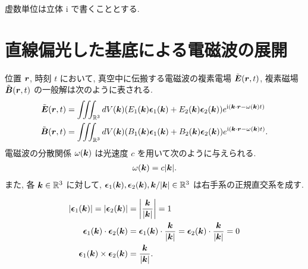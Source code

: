 \documentclass[a4paper,dvipdfmx]{jsarticle}
\theoremstyle{definition}
\begin{document}
\title{}
\author{
  学籍番号:21B00349\\
  氏名:宇佐見　大希\\
}
\maketitle

\newcommand{\ZZ}{\mathbb{Z}}
\newcommand{\RR}{\mathbb{R}}
\newcommand{\CC}{\mathbb{C}}
\newcommand{\EE}{\vb*{E}}
\newcommand{\Et}{\tilde{E}}
\newcommand{\ET}{\tilde{\vb*{E}}}
\newcommand{\Ec}{\mathcal{E}}
\newcommand{\EC}{\vb*{\mathcal{E}}}
\newcommand{\BB}{\vb*{B}}
\newcommand{\LL}{\vb*{L}}
\renewcommand{\AA}{\vb*{A}}
\newcommand{\ee}{\vb*{\epsilon}}
\newcommand{\kk}{\vb*{k}}
\newcommand{\rr}{\vb*{r}}
\renewcommand{\SS}{\vb*{S}}
\newcommand{\JJ}{\vb*{J}}
\newcommand{\ii}{\mathrm{i}}

虚数単位は立体 $\ii$ で書くこととする.

\section{直線偏光した基底による電磁波の展開}

位置 $\rr$, 時刻 $t$ において, 真空中に伝搬する電磁波の複素電場 $\tilde{\EE}(\rr, t)$, 複素磁場 $\tilde{\BB}(\rr, t)$ の一般解は次のように表される.
\begin{align}
  \tilde{\EE}(\rr, t) & = \iiint_{\RR^3} dV(\kk)(E_1(\kk)\ee_1(\kk) + E_2(\kk)\ee_2(\kk))e^{\ii(\kk\cdot\rr - \omega(\kk)t)} \label{tilde E}  \\
  \tilde{\BB}(\rr, t) & = \iiint_{\RR^3} dV(\kk)(B_1(\kk)\ee_1(\kk) + B_2(\kk)\ee_2(\kk))e^{\ii(\kk\cdot\rr - \omega(\kk)t)}. \label{tilde B}
\end{align}
電磁波の分散関係 $\omega(\kk)$ は光速度 $c$ を用いて次のように与えられる.
\begin{align}
  \omega(\kk) = c\lvert\kk\rvert.
\end{align}
また, 各 $\kk\in\RR^3$ に対して, $\ee_1(\kk), \ee_2(\kk), \kk/\lvert\kk\rvert\in\RR^3$ は右手系の正規直交系を成す.

\begin{align}
  |\ee_1(\kk)| = |\ee_2(\kk)| & = \left|\frac{\kk}{|\kk|}\right| = 1                                      \\
  \ee_1(\kk)\cdot\ee_2(\kk)   & = \ee_1(\kk)\cdot\frac{\kk}{|\kk|} = \ee_2(\kk)\cdot\frac{\kk}{|\kk|} = 0 \\
  \ee_1(\kk)\times\ee_2(\kk)  & = \frac{\kk}{|\kk|}.
\end{align}
\end{document}
